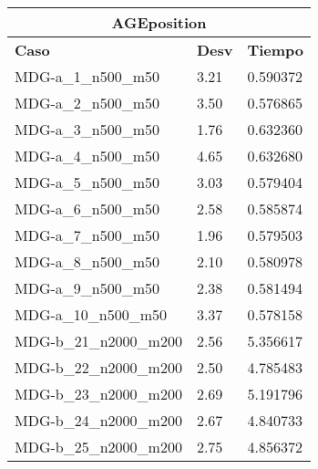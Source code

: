 \documentclass[10pt,a4paper]{article}
\begin{document}
\begin{table}[]
	\centering
	\begin{tabular}{|l|l|l|}
		\hline
		\multicolumn{3}{|c|}{\textbf{AGEposition}}                                                         \\ \hline
		\textbf{Caso}          & \multicolumn{1}{c|}{\textbf{Desv}} & \multicolumn{1}{c|}{\textbf{Tiempo}} \\ \hline
		MDG-a\_1\_n500\_m50    & 3.21                               & 0.590372                             \\ \hline
		MDG-a\_2\_n500\_m50    & 3.50                               & 0.576865                             \\ \hline
		MDG-a\_3\_n500\_m50    & 1.76                               & 0.632360                             \\ \hline
		MDG-a\_4\_n500\_m50    & 4.65                               & 0.632680                             \\ \hline
		MDG-a\_5\_n500\_m50    & 3.03                               & 0.579404                             \\ \hline
		MDG-a\_6\_n500\_m50    & 2.58                               & 0.585874                             \\ \hline
		MDG-a\_7\_n500\_m50    & 1.96                               & 0.579503                             \\ \hline
		MDG-a\_8\_n500\_m50    & 2.10                               & 0.580978                             \\ \hline
		MDG-a\_9\_n500\_m50    & 2.38                               & 0.581494                             \\ \hline
		MDG-a\_10\_n500\_m50   & 3.37                               & 0.578158                             \\ \hline
		MDG-b\_21\_n2000\_m200 & 2.56                               & 5.356617                             \\ \hline
		MDG-b\_22\_n2000\_m200 & 2.50                               & 4.785483                             \\ \hline
		MDG-b\_23\_n2000\_m200 & 2.69                               & 5.191796                             \\ \hline
		MDG-b\_24\_n2000\_m200 & 2.67                               & 4.840733                             \\ \hline
		MDG-b\_25\_n2000\_m200 & 2.75                               & 4.856372                             \\ \hline

\end{tabular}
\end{table}
\end{document}
